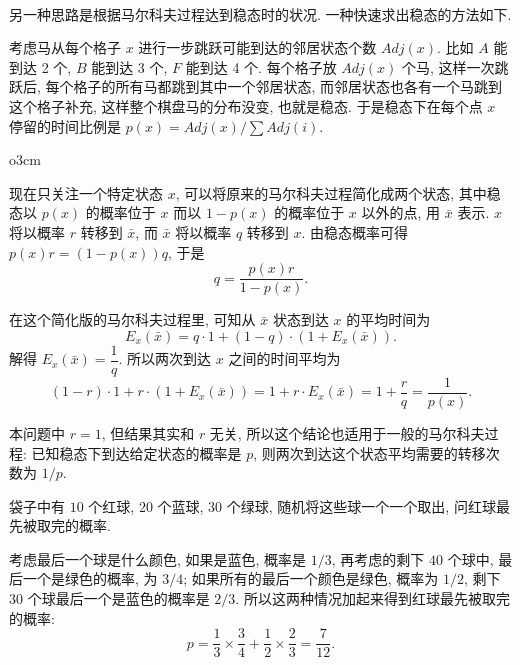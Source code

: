 ~

另一种思路是根据马尔科夫过程达到稳态时的状况. 一种快速求出稳态的方法如下. 

考虑马从每个格子 $ x $ 进行一步跳跃可能到达的邻居状态个数 $ Adj(x) $. 比如 $ A $ 能到达 2 个, $ B $ 能到达 3 个, $ F $ 能到达 4 个. 每个格子放 $ Adj(x) $ 个马, 这样一次跳跃后, 每个格子的所有马都跳到其中一个邻居状态, 而邻居状态也各有一个马跳到这个格子补充, 这样整个棋盘马的分布没变, 也就是稳态. 于是稳态下在每个点 $ x $ 停留的时间比例是 $ p(x) = Adj(x)/\sum{Adj(i)} $.  

\begin{wrapfigure}{o}{3cm}
\vspace{-1em}
\end{wrapfigure}
\mbox{}
现在只关注一个特定状态 $ x $, 可以将原来的马尔科夫过程简化成两个状态, 其中稳态以 $ p(x) $ 的概率位于 $ x $ 而以 $ 1 - p(x) $ 的概率位于 $ x $ 以外的点, 用 $ \bar{x} $ 表示. $ x $ 将以概率 $ r $ 转移到 $ \bar{x} $, 而 $ \bar{x} $ 将以概率 $ q $ 转移到 $ x $. 由稳态概率可得 $ p(x) r = (1-p(x))q $, 于是 
\[ q = \frac{p(x)r}{1-p(x)}. \]

在这个简化版的马尔科夫过程里, 可知从 $ \bar{x} $ 状态到达 $ x $ 的平均时间为 
\[ E_x(\bar{x}) = q\cdot 1 + (1-q)\cdot (1+E_x(\bar{x})). \]
解得 $ E_x(\bar{x}) = \dfrac{1}{q}.$ 所以两次到达 $ x $ 之间的时间平均为 
\[ (1-r)\cdot 1 + r\cdot (1+E_x(\bar{x})) = 1 + r\cdot E_x(\bar{x}) = 1 + \frac{r}{q} = \dfrac{1}{p(x)} .\]

本问题中 $ r = 1 $, 但结果其实和 $ r $ 无关, 所以这个结论也适用于一般的马尔科夫过程: 已知稳态下到达给定状态的概率是 $ p $, 则两次到达这个状态平均需要的转移次数为 $ 1/p $.

\newpage

袋子中有 $ 10 $ 个红球, $ 20 $ 个蓝球, $ 30 $ 个绿球, 随机将这些球一个一个取出, 问红球最先被取完的概率.

考虑最后一个球是什么颜色, 如果是蓝色, 概率是 $ 1/3 $, 再考虑的剩下 $ 40 $ 个球中, 最后一个是绿色的概率, 为 $ 3/4 $; 如果所有的最后一个颜色是绿色, 概率为 $ 1/2 $, 剩下 $ 30 $ 个球最后一个是蓝色的概率是 $ 2/3 $. 所以这两种情况加起来得到红球最先被取完的概率: 
\[ p = \frac{1}{3} \times \frac{3}{4} + \frac{1}{2} \times \frac{2}{3} = \frac{7}{12} .\]

